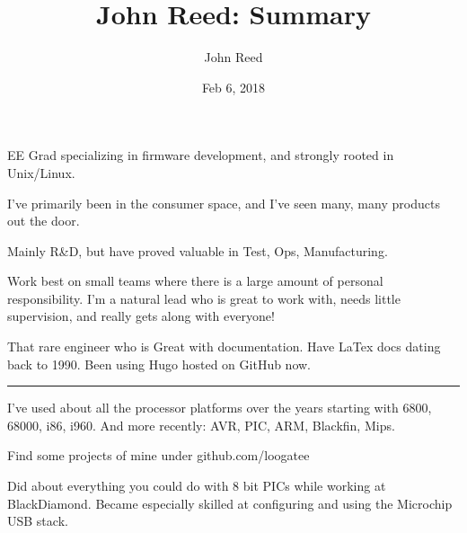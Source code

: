 \documentclass{article}
\title  { John Reed: Summary }
\author { John Reed          }
\date   { Feb 6, 2018      }
\begin{document}
\vspace{3mm}\noindent\parbox{.3in}{\hspace{.25in}}\parbox{6.0in}
{
EE Grad specializing in firmware development, and strongly rooted in Unix/Linux.
}


\vspace{3mm}\noindent\parbox{.3in}{\hspace{.25in}}\parbox{6.0in}
{
I've primarily been in the consumer space, and I've seen many, many products out the door.
}

\vspace{3mm}\noindent\parbox{.3in}{\hspace{.25in}}\parbox{6.0in}
{
Mainly R\&D, but have proved valuable in Test, Ops, Manufacturing.
}

\vspace{3mm}\noindent\parbox{.3in}{\hspace{.25in}}\parbox{6.0in}
{
Work best on small teams where there is a large amount of personal responsibility.  I'm a natural lead who is great to work with, needs little supervision, and really gets along with everyone!
}

\vspace{3mm}\noindent\parbox{.3in}{\hspace{.25in}}\parbox{6.0in}
{
That rare engineer who is Great with documentation.   Have LaTex docs dating back to 1990.  Been using Hugo hosted on GitHub now.
}


\vspace{3mm}\noindent\parbox{.3in}{\hspace{.25in}}\parbox{6.0in}
{
\rule{3.5in}{.01in}
}


\vspace{3mm}\noindent\parbox{.3in}{\hspace{.25in}}\parbox{6.0in}
{
I've used about all the processor platforms over the years starting with 6800, 68000, i86, i960.  And more recently: AVR, PIC, ARM, Blackfin, Mips.
}


\vspace{3mm}\noindent\parbox{.3in}{\hspace{.25in}}\parbox{6.0in}
{
Find some projects of mine under github.com/loogatee
}

\vspace{3mm}\noindent\parbox{.3in}{\hspace{.25in}}\parbox{6.0in}
{
Did about everything you could do with 8 bit PICs while working at BlackDiamond.  Became especially skilled at configuring and using the Microchip USB stack.
}
\end{document}
